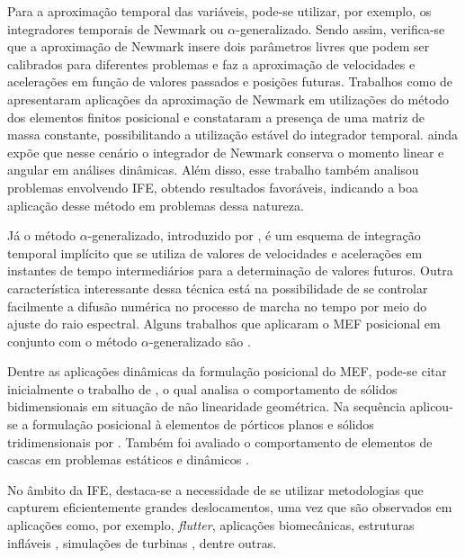Para a aproximação temporal das variáveis, pode-se utilizar, por exemplo, os integradores temporais de Newmark ou $\alpha$-generalizado. Sendo assim, verifica-se que a aproximação de Newmark insere dois parâmetros livres que podem ser calibrados para diferentes problemas e faz a aproximação de velocidades e acelerações em função de valores passados e posições futuras. Trabalhos como de  apresentaram aplicações da aproximação de Newmark em utilizações do método dos elementos finitos posicional e constataram a presença de uma matriz de massa constante, possibilitando a utilização estável do integrador temporal.  ainda expõe que nesse cenário o integrador de Newmark conserva o momento linear e angular em análises dinâmicas. Além disso, esse trabalho também analisou problemas envolvendo IFE, obtendo resultados favoráveis, indicando a boa aplicação desse método em problemas dessa natureza.

Já o método $\alpha$-generalizado, introduzido por , é um esquema de integração temporal implícito que se utiliza de valores de velocidades e acelerações em instantes de tempo intermediários para a determinação de valores futuros. Outra característica interessante dessa técnica está na possibilidade de se controlar facilmente a difusão numérica no processo de marcha no tempo por meio do ajuste do raio espectral. Alguns trabalhos que aplicaram o MEF posicional em conjunto com o método $\alpha$-generalizado são .

Dentre as aplicações dinâmicas da formulação posicional do MEF, pode-se citar inicialmente o trabalho de , o qual analisa o comportamento de sólidos bidimensionais em situação de não linearidade geométrica. Na sequência aplicou-se a formulação posicional à elementos de pórticos planos e sólidos tridimensionais por . Também foi avaliado o comportamento de elementos de cascas em problemas estáticos \cite{coda2007alternative} e dinâmicos \cite{coda2009unconstrained}.

No âmbito da IFE, destaca-se a necessidade de se utilizar metodologias que capturem eficientemente grandes deslocamentos, uma vez que são observados em aplicações como, por exemplo, \textit{flutter}, aplicações biomecânicas, estruturas infláveis \cite{karagiozis2011computational}, simulações de turbinas \cite{bazilevs20113d}, dentre outras.

